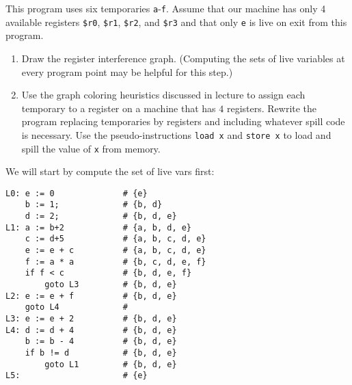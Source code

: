 \documentclass[10pt]{article}
\begin{document}
\begin{enumerate}
This program uses six temporaries \texttt{a}-\texttt{f}.  Assume that
our machine has only 4 available registers \texttt{\$r0},
\texttt{\$r1}, \texttt{\$r2}, and \texttt{\$r3}
and that only
\texttt{e} is live on exit from this program.

\begin{enumerate}
\item Draw the register interference graph.  (Computing the sets of
live variables at every program point may be helpful for this step.)

\item Use the graph coloring heuristics discussed in lecture to assign
  each temporary to a register on a machine that has $4$ registers.
Rewrite the program replacing temporaries by registers and including whatever
spill code is necessary.  Use the pseudo-instructions \texttt{load x}
and \texttt{store x} to load and spill the value of \texttt{x} from
memory.
\end{enumerate}

We will start by compute the set of live vars first:

\begin{lstlisting}[tabsize=4]
L0: e := 0 				# {e}		 
    b := 1;				# {b, d}		
    d := 2;				# {b, d, e}		
L1: a := b+2			# {a, b, d, e}		
    c := d+5			# {a, b, c, d, e}		
    e := e + c 			# {a, b, c, d, e}		
    f := a * a 			# {b, c, d, e, f}		
    if f < c 			# {b, d, e, f}		
    	goto L3			# {b, d, e}		
L2: e := e + f 			# {b, d, e}		
    goto L4				# 
L3: e := e + 2			# {b, d, e}		
L4: d := d + 4			# {b, d, e}		
    b := b - 4			# {b, d, e}		
    if b != d 			# {b, d, e} 
    	goto L1			# {b, d, e}
L5:						# {e}
\end{lstlisting}

\begin{center}\end{center}



\end{enumerate}
\end{document}

